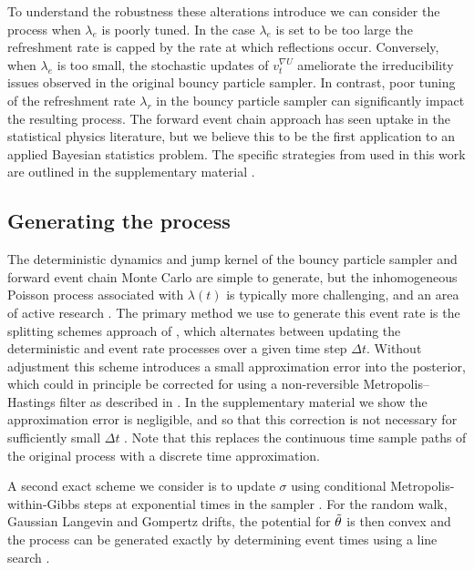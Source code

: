 \documentclass[ba,preprint]{imsart}
\theoremstyle{plain}
\theoremstyle{definition}
\theoremstyle{remark}
\begin{document}
To understand the robustness these alterations introduce we can consider the process when $\lambda_e$ is poorly tuned. In the case $\lambda_e$ is set to be too large the refreshment rate is capped by the rate at which reflections occur. Conversely, when $\lambda_e$ is too small, the stochastic updates of $v_t^{\nabla U}$ ameliorate the irreducibility issues observed in the original bouncy particle sampler. In contrast, poor tuning of the refreshment rate $\lambda_r$ in the bouncy particle sampler can significantly impact the resulting process. The forward event chain approach has seen uptake in the statistical physics literature, but we believe this to be the first application to an applied Bayesian statistics problem. The specific strategies from \cite{Michel2020} used in this work are outlined in the supplementary material \citep[{\color{red}Section 2.1}]{Hardcastle2024supp}.

\subsection{Generating the process} %
\label{sec;PDMP_gen}

The deterministic dynamics and jump kernel of the bouncy particle sampler and forward event chain Monte Carlo are simple to generate, but the inhomogeneous Poisson process associated with $\lambda(t)$ is typically more challenging, and an area of active research \citep{Andral2024, Corbella2022, Sutton2023}. The primary method we use to generate this event rate is the splitting schemes approach of \citep{Bertazzi2023}, which alternates between updating the deterministic and event rate processes over a given time step $\Delta t$. Without adjustment this scheme introduces a small approximation error into the posterior, which could in principle be corrected for using a non-reversible Metropolis--Hastings filter as described in \cite{Bertazzi2023}. {\color{red}In the supplementary material we show the approximation error is negligible, and so that this correction is not necessary for sufficiently small $\Delta t$ \citep[Section 2.4]{Hardcastle2024supp}}. Note that this replaces the continuous time sample paths of the original process with a discrete time approximation.

A second exact scheme we consider is to update $\sigma$ using conditional Metropolis-within-Gibbs steps at exponential times in the sampler \citep{Sachs2023}. For the random walk, Gaussian Langevin and Gompertz drifts, the potential for $\Tilde{\theta}$ is then convex and the process can be generated exactly by determining event times using a line search \cite[Example 1]{Bouchard2018}. 
\end{document}
